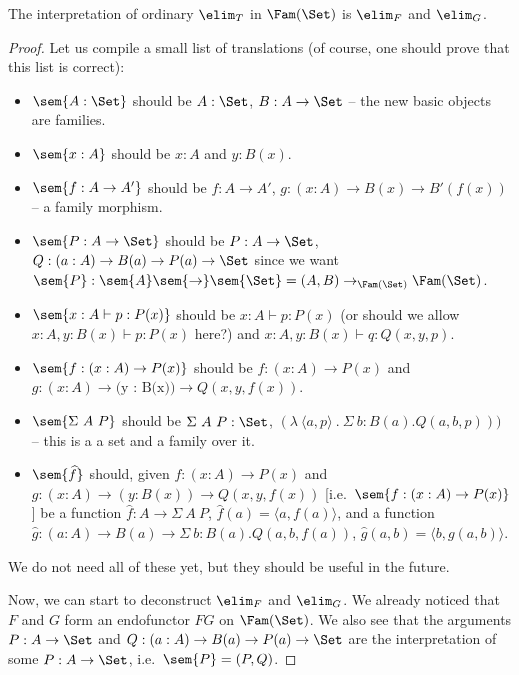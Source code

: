 \documentclass{article}
\begin{document}
\begin{problem}
  The interpretation of ordinary $\elim_T$ in $\Fam(\Set)$ is $\elim_F$ and $\elim_G$.
\end{problem}
\begin{proof}
Let us compile a small list of translations (of course, one should prove that this list is correct):

\begin{itemize}
\item $\sem{A : \Set}$ should be $A : \Set$, $B : A \to \Set$ -- the new basic objects are families.
\item $\sem{x : A}$ should be $x : A$ and $y : B(x)$.
\item $\sem{f : A \to A'}$ should be $f : A \to A'$, $g : (x : A) \to B(x) \to B'(f(x))$ -- a family morphism.
\item $\sem{P : A \to \Set}$ should be $P : A \to \Set$, $Q : (a : A)
  \to B(a) \to P(a) \to \Set$ since we want $\sem{P} : \sem{A}
  \sem{\to} \sem{\Set} = (A, B) \to_{\Fam(\Set)} \Fam(\Set)$.
\item $\sem{x : A \vdash p : P(x)}$ should be $x : A \vdash p : P(x)$
  (or should we allow $x : A, y : B(x) \vdash p : P(x)$ here?) and $x
  : A, y : B(x) \vdash q : Q(x, y, p)$.
\item $\sem{f : (x : A) \to P(x)}$ should be $f : (x : A) \to P(x)$
  and $g : (x : A) \to \mbox{(y : B(x))} \to Q(x, y, f(x))$.
\item $\sem{\Sigma\ A\ P}$ should be $\Sigma\ A\ P : \Set$, $(\lambda\
  \langle a, p\rangle\ .\ \Sigma\ b\!:\!B(a).Q(a,b, p)))$ -- this is a
  a set and a family over it.
\item $\sem{\widehat{f}}$ should, given $f : (x : A) \to P(x)$ and $g
  : (x : A) \to (y : B(x)) \to Q(x, y, f(x))$ [i.e.\ $\sem{f : (x : A)
    \to P(x)}$] be a function $\widehat{f} : A \to \Sigma\ A\ P$,
  $\widehat{f}(a) = \langle a, f(a)\rangle$, and a function
  $\widehat{g} : (a : A) \to B(a) \to \Sigma\ b\!:\!B(a).Q(a,b,
  f(a))$, $\widehat{g}(a, b) = \langle b, g(a, b)\rangle$.
\end{itemize}
We do not need all of these yet, but they should be useful in the future.

Now, we can start to deconstruct $\elim_F$ and $\elim_G$. We already
noticed that $F$ and $G$ form an endofunctor $FG$ on $\Fam(\Set)$. We
also see that the arguments $P : A \to \Set$ and $Q : (a : A) \to B(a)
\to P(a) \to \Set$ are the interpretation of some $P : A \to \Set$,
i.e.\ $\sem{P} = (P, Q)$.


\end{proof}
\end{document}
